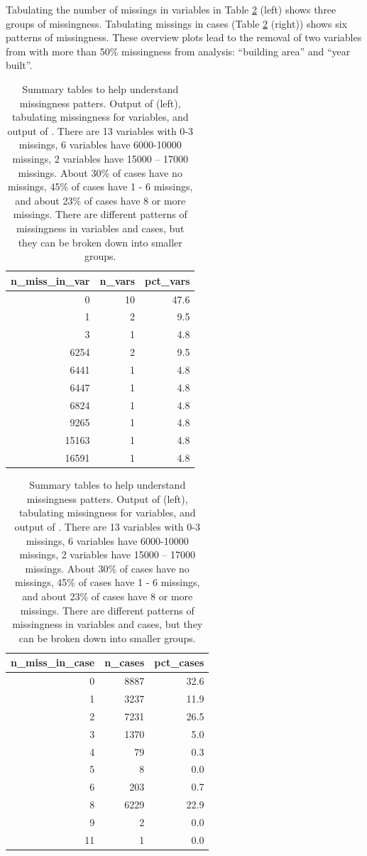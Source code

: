 \documentclass[
]{jss}
\begin{document}
Tabulating the number of missings in variables in Table \ref{tab:housing-miss-var-case-table} (left) shows three groups of missingness. Tabulating missings in cases (Table \ref{tab:housing-miss-var-case-table} (right)) shows six patterns of missingness. These overview plots lead to the removal of two variables from with more than 50\% missingness from analysis: ``building area'' and ``year built''.

\begin{CodeChunk}
\begin{table}
\caption{\label{tab:housing-miss-var-case-table}Summary tables to help understand missingness patters. Output of  (left), tabulating missingness for variables, and output of . There are 13 variables with 0-3 missings, 6 variables have 6000-10000 missings, 2 variables have 15000 – 17000 missings. About 30\% of cases have no missings, 45\% of cases have 1 - 6 missings, and about 23\% of cases have 8 or more missings. There are different patterns of missingness in variables and cases, but they can be broken down into smaller groups.}

\centering
\begin{tabular}[t]{r|r|r}
\hline
n\_miss\_in\_var & n\_vars & pct\_vars\\
\hline
0 & 10 & 47.6\\
\hline
1 & 2 & 9.5\\
\hline
3 & 1 & 4.8\\
\hline
6254 & 2 & 9.5\\
\hline
6441 & 1 & 4.8\\
\hline
6447 & 1 & 4.8\\
\hline
6824 & 1 & 4.8\\
\hline
9265 & 1 & 4.8\\
\hline
15163 & 1 & 4.8\\
\hline
16591 & 1 & 4.8\\
\hline
\end{tabular}
\centering
\begin{tabular}[t]{r|r|r}
\hline
n\_miss\_in\_case & n\_cases & pct\_cases\\
\hline
0 & 8887 & 32.6\\
\hline
1 & 3237 & 11.9\\
\hline
2 & 7231 & 26.5\\
\hline
3 & 1370 & 5.0\\
\hline
4 & 79 & 0.3\\
\hline
5 & 8 & 0.0\\
\hline
6 & 203 & 0.7\\
\hline
8 & 6229 & 22.9\\
\hline
9 & 2 & 0.0\\
\hline
11 & 1 & 0.0\\
\hline
\end{tabular}
\end{table}

\end{CodeChunk}
\end{document}
